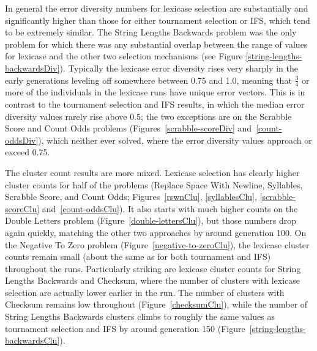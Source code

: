 In general the error diversity numbers for lexicase selection are substantially and significantly
higher than those for either tournament selection or IFS, which tend to be extremely similar.
The String Lengths Backwards problem was the only problem for which there was any substantial overlap 
between the range of values for lexicase and the other two selection mechanisms (see 
Figure \ref{string-lengths-backwardsDiv}). Typically the lexicase error diversity rises very sharply
in the early generations leveling off somewhere between 0.75 and 1.0, meaning that $\frac{3}{4}$ or
more of the individuals in the lexicase runs have unique error vectors. This is in contrast
to the tournament selection and IFS results, in which the median error diversity values rarely rise above
0.5; the two exceptions are on the Scrabble Score and Count Odds problems 
(Figures~\ref{scrabble-scoreDiv} and~\ref{count-oddsDiv}), which neither ever
solved, where the error diversity values approach or exceed 0.75.

The cluster count results are more mixed. Lexicase selection has clearly higher cluster counts for
half of the problems (Replace Space With Newline, Syllables, Scrabble Score, and Count Odds;
Figures~\ref{rswnClu}, \ref{syllablesClu}, \ref{scrabble-scoreClu} and~\ref{count-oddsClu}).
It also starts with much higher counts on the Double Letters problem (Figure~\ref{double-lettersClu}), 
but those numbers drop again quickly, matching the other two approaches by around generation 100. 
On the Negative To Zero problem (Figure~\ref{negative-to-zeroClu}), the lexicase
cluster counts remain small (about the same as for both tournament and IFS) throughout the runs.
Particularly striking are lexicase cluster counts for String Lengths Backwards and Checksum, where the
number of clusters with lexicase selection are actually lower earlier in the run. The number of clusters with
Checksum remains low throughout (Figure~\ref{checksumClu}), while the number of String Lengths Backwards 
clusters climbs to roughly the same values as tournament selection and IFS by around generation 150 
(Figure~\ref{string-lengths-backwardsClu}).

